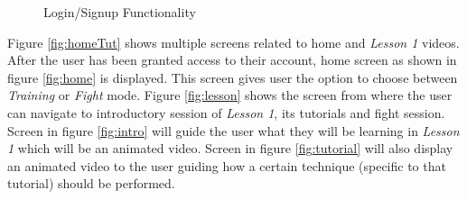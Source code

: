 \begin{figure}[ht]
{  }
  \quad 
  \caption{Login/Signup Functionality} 
  \centering
  \label{fig:startingScreens}
\end{figure}
\clearpage
Figure \ref{fig:homeTut} shows multiple screens related to home and \textit{Lesson 1} videos. After the user has been granted access to their account, home screen as shown in figure \ref{fig:home} is displayed. This screen gives user the option to choose between \textit{Training} or \textit{Fight} mode. Figure \ref{fig:lesson} shows the screen from where the user can navigate to introductory session of \textit{Lesson 1}, its tutorials and fight session. Screen in figure \ref{fig:intro} will guide the user what they will be learning in \textit{Lesson 1} which will be an animated video. Screen in figure \ref{fig:tutorial} will also display an animated video to the user guiding how a certain technique (specific to that tutorial) should be performed. 
